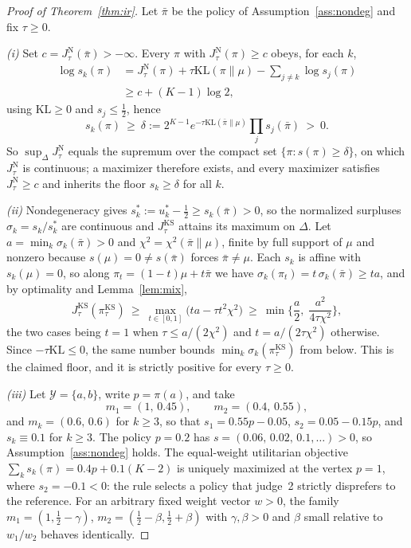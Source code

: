 \documentclass[letterpaper]{article} %
\newcommand{\Y}{\mathcal{Y}}
\newcommand{\KL}{\mathrm{KL}}
\begin{document}
\begin{proof}[Proof of Theorem~\ref{thm:ir}]
Let $\bar\pi$ be the policy of Assumption~\ref{ass:nondeg} and fix $\tau\ge0$.

\emph{(i)} Set $c=J^{\mathrm N}_\tau(\bar\pi)>-\infty$. Every $\pi$ with $J^{\mathrm N}_\tau(\pi)\ge c$ obeys, for each $k$,
\[
\begin{aligned}
\log s_k(\pi)&=J^{\mathrm N}_\tau(\pi)+\tau\KL(\pi\|\mu)-\sum_{j\ne k}\log s_j(\pi)\\
&\ge c+(K-1)\log2,
\end{aligned}
\]
using $\KL\ge0$ and $s_j\le\tfrac12$, hence
\[
s_k(\pi)\ \ge\ \delta:=2^{K-1}e^{-\tau\KL(\bar\pi\|\mu)}\prod_{j}s_j(\bar\pi)\ >\ 0.
\]
So $\sup_\Delta J^{\mathrm N}_\tau$ equals the supremum over the compact set $\{\pi:s(\pi)\ge\delta\}$, on which $J^{\mathrm N}_\tau$ is continuous; a maximizer therefore exists, and every maximizer satisfies $J^{\mathrm N}_\tau\ge c$ and inherits the floor $s_k\ge\delta$ for all $k$.

\emph{(ii)} Nondegeneracy gives $s^\ast_k:=u^\ast_k-\tfrac12\ge s_k(\bar\pi)>0$, so the normalized surpluses $\sigma_k=s_k/s^\ast_k$ are continuous and $J^{\mathrm{KS}}_\tau$ attains its maximum on $\Delta$. Let $a=\min_k\sigma_k(\bar\pi)>0$ and $\chi^2=\chi^2(\bar\pi\|\mu)$, finite by full support of $\mu$ and nonzero because $s(\mu)=0\ne s(\bar\pi)$ forces $\bar\pi\ne\mu$. Each $s_k$ is affine with $s_k(\mu)=0$, so along $\pi_t=(1-t)\mu+t\bar\pi$ we have $\sigma_k(\pi_t)=t\,\sigma_k(\bar\pi)\ge ta$, and by optimality and Lemma~\ref{lem:mix},
\[
J^{\mathrm{KS}}_\tau(\pi^{\mathrm{KS}}_\tau)\ \ge\ \max_{t\in[0,1]}\big(ta-\tau t^2\chi^2\big)\ \ge\ \min\Big\{\frac a2,\;\frac{a^2}{4\tau\chi^2}\Big\},
\]
the two cases being $t=1$ when $\tau\le a/(2\chi^2)$ and $t=a/(2\tau\chi^2)$ otherwise. Since $-\tau\KL\le0$, the same number bounds $\min_k\sigma_k(\pi^{\mathrm{KS}}_\tau)$ from below. This is the claimed floor, and it is strictly positive for every $\tau\ge0$.

\emph{(iii)} Let $\Y=\{a,b\}$, write $p=\pi(a)$, and take
\[
m_1=(1,\,0.45),\qquad m_2=(0.4,\,0.55),
\]
and $m_k=(0.6,\,0.6)$ for $k\ge3$, so that $s_1=0.55p-0.05$, $s_2=0.05-0.15p$, and $s_k\equiv0.1$ for $k\ge3$. The policy $p=0.2$ has $s=(0.06,\,0.02,\,0.1,\dots)>0$, so Assumption~\ref{ass:nondeg} holds. The equal-weight utilitarian objective $\sum_ks_k(\pi)=0.4p+0.1(K-2)$ is uniquely maximized at the vertex $p=1$, where $s_2=-0.1<0$: the rule selects a policy that judge~2 strictly disprefers to the reference. For an arbitrary fixed weight vector $w>0$, the family $m_1=(1,\tfrac12-\gamma)$, $m_2=(\tfrac12-\beta,\tfrac12+\beta)$ with $\gamma,\beta>0$ and $\beta$ small relative to $w_1/w_2$ behaves identically.
\end{proof}
\end{document}
